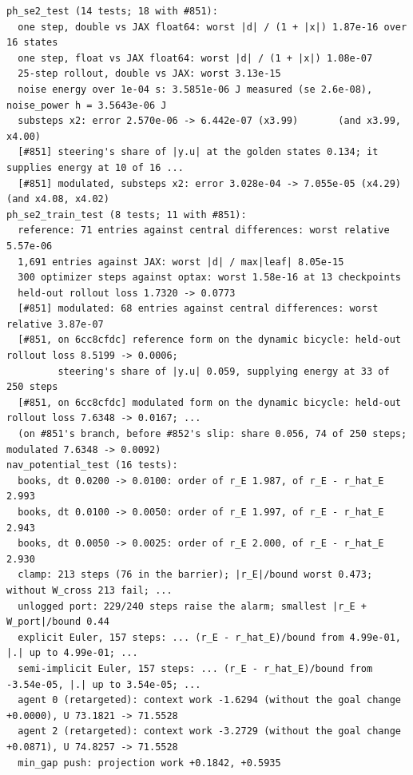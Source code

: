 \documentclass[11pt]{article}
\theoremstyle{remark}
\begin{document}
\begin{center}
\begin{minipage}{0.98\linewidth}
\scriptsize
\begin{verbatim}
ph_se2_test (14 tests; 18 with #851):
  one step, double vs JAX float64: worst |d| / (1 + |x|) 1.87e-16 over 16 states
  one step, float vs JAX float64: worst |d| / (1 + |x|) 1.08e-07
  25-step rollout, double vs JAX: worst 3.13e-15
  noise energy over 1e-04 s: 3.5851e-06 J measured (se 2.6e-08), noise_power h = 3.5643e-06 J
  substeps x2: error 2.570e-06 -> 6.442e-07 (x3.99)       (and x3.99, x4.00)
  [#851] steering's share of |y.u| at the golden states 0.134; it supplies energy at 10 of 16 ...
  [#851] modulated, substeps x2: error 3.028e-04 -> 7.055e-05 (x4.29)   (and x4.08, x4.02)
ph_se2_train_test (8 tests; 11 with #851):
  reference: 71 entries against central differences: worst relative 5.57e-06
  1,691 entries against JAX: worst |d| / max|leaf| 8.05e-15
  300 optimizer steps against optax: worst 1.58e-16 at 13 checkpoints
  held-out rollout loss 1.7320 -> 0.0773
  [#851] modulated: 68 entries against central differences: worst relative 3.87e-07
  [#851, on 6cc8cfdc] reference form on the dynamic bicycle: held-out rollout loss 8.5199 -> 0.0006;
         steering's share of |y.u| 0.059, supplying energy at 33 of 250 steps
  [#851, on 6cc8cfdc] modulated form on the dynamic bicycle: held-out rollout loss 7.6348 -> 0.0167; ...
  (on #851's branch, before #852's slip: share 0.056, 74 of 250 steps; modulated 7.6348 -> 0.0092)
nav_potential_test (16 tests):
  books, dt 0.0200 -> 0.0100: order of r_E 1.987, of r_E - r_hat_E 2.993
  books, dt 0.0100 -> 0.0050: order of r_E 1.997, of r_E - r_hat_E 2.943
  books, dt 0.0050 -> 0.0025: order of r_E 2.000, of r_E - r_hat_E 2.930
  clamp: 213 steps (76 in the barrier); |r_E|/bound worst 0.473; without W_cross 213 fail; ...
  unlogged port: 229/240 steps raise the alarm; smallest |r_E + W_port|/bound 0.44
  explicit Euler, 157 steps: ... (r_E - r_hat_E)/bound from 4.99e-01, |.| up to 4.99e-01; ...
  semi-implicit Euler, 157 steps: ... (r_E - r_hat_E)/bound from -3.54e-05, |.| up to 3.54e-05; ...
  agent 0 (retargeted): context work -1.6294 (without the goal change +0.0000), U 73.1821 -> 71.5528
  agent 2 (retargeted): context work -3.2729 (without the goal change +0.0871), U 74.8257 -> 71.5528
  min_gap push: projection work +0.1842, +0.5935
\end{verbatim}
\end{minipage}
\end{center}
\end{document}
